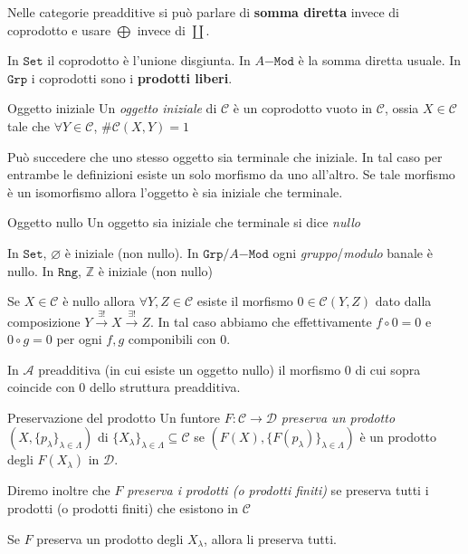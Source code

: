 Nelle categorie preadditive si può parlare di \textbf{somma diretta} invece di
coprodotto e usare \(\bigoplus\) invece di \(\coprod\).

\begin{example}{}
    In \(\mathtt{Set}\) il coprodotto è l'unione disgiunta. In \(A\mathtt{-Mod}\) è la somma diretta usuale. In \(\mathtt{Grp}\) i coprodotti sono i \textbf{prodotti liberi}.
\end{example}

\begin{definition}{Oggetto iniziale}
    Un \emph{oggetto iniziale} di \(\mathcal{\mathcal{C}}\) è un coprodotto vuoto in \(\mathcal{C}\), ossia \(X \in \mathcal{\mathcal{C}}\) tale che
    \(\forall Y \in \mathcal{\mathcal{C}}\), \(\# \mathcal{\mathcal{C}}{(X, Y)} = 1\) 
\end{definition}

Può succedere che uno stesso oggetto sia terminale che iniziale. In tal caso per entrambe le definizioni esiste un solo morfismo da uno all'altro. Se tale morfismo è un isomorfismo
allora l'oggetto è sia iniziale che terminale.

\begin{definition}{Oggetto nullo}
    Un oggetto sia iniziale che terminale si dice \emph{nullo}
\end{definition}

\begin{example}{}
    In \(\mathtt{Set}\), \(\varnothing\) è iniziale (non nullo).
    In \(\mathtt{Grp}/A\mathtt{-Mod}\) ogni \emph{gruppo}/\emph{modulo} banale è
    nullo.
    In \(\mathtt{Rng}\), \(\mathbb{Z}\) è iniziale (non nullo)
\end{example}

    Se \(X \in \mathcal{\mathcal{C}}\) è nullo allora \(\forall Y, Z \in \mathcal{\mathcal{C}}\)
    esiste il morfismo \(0 \in \mathcal{\mathcal{C}}{(Y, Z)}\) dato dalla composizione
    \(Y \overset{\exists !}{\to } X \overset{\exists !}{\to } Z\). In tal caso
    abbiamo che effettivamente \(f \circ 0 = 0\) e \(0 \circ g = 0\)  per ogni
    \(f, g\) componibili con \(0\).
\begin{example}{}
    In \(\mathcal{A}\) preadditiva (in cui esiste un oggetto nullo) il morfismo
    0 di cui sopra coincide con 0 dello struttura preadditiva.
\end{example}

\begin{definition}{Preservazione del prodotto}
    Un funtore \(F : \mathcal{\mathcal{C}} \to \mathcal{D}\) \emph{preserva un prodotto}
    \({(X, \{p_\lambda\} _{\lambda \in \Lambda} )}\) di \(\{X_\lambda\}_{\lambda \in \Lambda} \subseteq \mathcal{\mathcal{C}} \) se \({(F{(X)}, \{F{(p_\lambda)}\}_{\lambda \in \Lambda}  )}\) è un prodotto degli \(F{(X_{\lambda} )}\) in \(\mathcal{D}\).

    Diremo inoltre che \(F\) \emph{preserva i prodotti (o prodotti finiti)} se preserva
    tutti i prodotti (o prodotti finiti) che esistono in \(\mathcal{\mathcal{C}}\) 
\end{definition}
\begin{remark}{}
    Se \(F\) preserva un prodotto degli \(X_\lambda\), allora li preserva tutti.
\end{remark}

